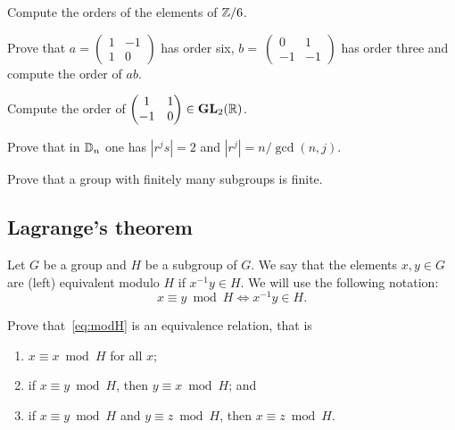\begin{exercise}
        Compute the orders of the elements of $\mathbb{Z}/6$.
\end{exercise}       

\begin{exercise}
        Prove that $a=\begin{pmatrix}1&-1\\1&0\end{pmatrix}$ has order six, $b=\
        \begin{pmatrix}0&1\\-1&-1\end{pmatrix}$ has order three and 
        compute the order of $ab$.%
\end{exercise}
                                
\begin{exercise}
        Compute the order of 
        $\begin{pmatrix}1&1\\-1&0\end{pmatrix}\in\mathbf{GL}_2(\mathbb{R})$.
\end{exercise}
                                
\begin{exercise}
        Prove that in $\mathbb{D}_n$ one has 
        $|r^js|=2$ and $|r^j|=n/\gcd(n,j)$.
\end{exercise}
                                
\begin{exercise}
        Prove that a group with finitely many subgroups
        is finite. 
\end{exercise}




\subsection{Lagrange's theorem}

Let $G$ be a group and $H$ be a subgroup of $G$. We say that the elements $x,y\in
G$ are (left) equivalent modulo $H$ if $x^{-1}y\in H$.
We will use the following notation:
\begin{equation}
\label{eq:modH}
    x\equiv y\bmod
    H\Longleftrightarrow x^{-1}y\in H.
\end{equation}

\begin{exercise}
    Prove that~\eqref{eq:modH} is an equivalence relation, that
    is 
    \begin{enumerate}
    \item $x\equiv x\bmod H$ for all $x$; 
    \item if $x\equiv y\bmod H$, then $y\equiv x\bmod H$; and 
    \item if $x\equiv y\bmod H$ and $y\equiv z\bmod H$, then $x\equiv z\bmod H$.
    \end{enumerate}
\end{exercise}


